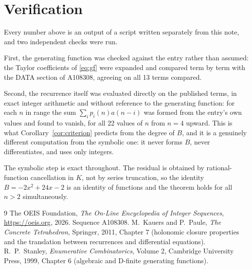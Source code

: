 \documentclass[11pt,a4paper]{article}
\theoremstyle{plain}
\theoremstyle{definition}
\begin{document}
\section{Verification}

Every number above is an output of a script written separately from this note, and two
independent checks were run.

First, the generating function was checked against the entry rather than assumed: the
Taylor coefficients of \eqref{eq:gf} were expanded and compared term by term with the DATA
section of A108308, agreeing on all 13 terms compared.

Second, the recurrence itself was evaluated directly on the published terms, in exact
integer arithmetic and without reference to the generating function: for each $n$ in range
the sum $\sum_{i}p_{i}(n)a(n-i)$ was formed from the entry's own values and found to
vanish, for all 22 values of $n$ from $n=4$ upward. This is what
Corollary~\ref{cor:criterion} predicts from the degree of $B$, and it is a genuinely
different computation from the symbolic one: it never forms $B$, never differentiates, and
uses only integers.

The symbolic step is exact throughout. The residual is obtained by rational-function
cancellation in $K$, not by series truncation, so the identity $B=- 2 x^{2} + 24 x - 2$ is an
identity of functions and the theorem holds for all $n>2$ simultaneously.

\begin{thebibliography}{9}
 The OEIS Foundation, \emph{The On-Line Encyclopedia of Integer Sequences},
\url{https://oeis.org}, 2026. Sequence A108308.
 M.~Kauers and P.~Paule, \emph{The Concrete Tetrahedron}, Springer, 2011,
Chapter 7 (holonomic closure properties and the translation between recurrences and
differential equations).
 R.~P.~Stanley, \emph{Enumerative Combinatorics}, Volume 2, Cambridge
University Press, 1999, Chapter 6 (algebraic and D-finite generating functions).
\end{thebibliography}
\end{document}
